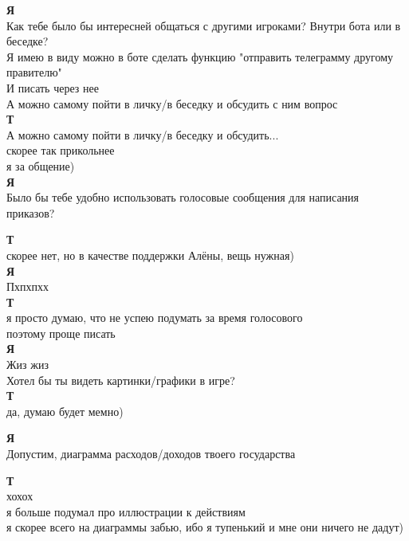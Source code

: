 \textbf{Я} \\
Как тебе было бы интересней общаться с другими игроками? Внутри бота или в беседке?\\

Я имею в виду можно в боте сделать функцию "отправить телеграмму другому правителю" \\
И писать через нее\\

А можно самому пойти в личку/в беседку и обсудить с ним вопрос\\

\textbf{Т} \\
А можно самому пойти в личку/в беседку и обсудить... \\
скорее так прикольнее\\

я за общение)\\

\textbf{Я} \\
Было бы тебе удобно использовать голосовые сообщения для написания приказов?

\textbf{Т} \\
скорее нет, но в качестве поддержки Алёны, вещь нужная)\\

\textbf{Я} \\
Пхпхпхх\\

\textbf{Т} \\
я просто думаю, что не успею подумать за время голосового \\
поэтому проще писать\\

\textbf{Я} \\
Жиз жиз\\

Хотел бы ты видеть картинки/графики в игре?\\

\textbf{Т} \\
да, думаю будет мемно)

\textbf{Я} \\
Допустим, диаграмма расходов/доходов твоего государства

\textbf{Т} \\
хохох \\
я больше подумал про иллюстрации к действиям \\
я скорее всего на диаграммы забью, ибо я тупенький и мне они ничего не дадут)\\

